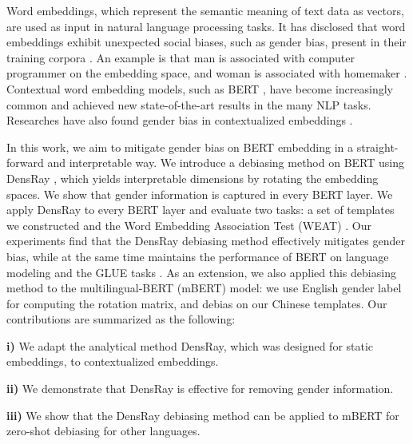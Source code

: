 Word embeddings, which represent the semantic meaning of text data as vectors, are used as input in natural language processing tasks. It has disclosed that word embeddings exhibit unexpected social biases, such as gender bias, present in their training corpora \citep{bolukbasi2016man, caliskan2017semantics,garg2018word}. An example is that man is associated with computer programmer on the embedding space, and woman is associated with homemaker \citep{bolukbasi2016man}. Contextual word embedding models, such as BERT \citep{devlin2018bert}, have become increasingly common and achieved new state-of-the-art results in the many NLP tasks. Researches have also found gender bias in contextualized embeddings \citep{zhao2019gender,may2019measuring}.

In this work, we aim to mitigate gender bias on BERT embedding in a straight-forward and interpretable way. We introduce a debiasing method on BERT using DensRay \citep{dufter2019analytical}, which yields interpretable dimensions by rotating the embedding spaces. We show that gender information is captured in every BERT layer. We apply DensRay to every BERT layer and evaluate two tasks: a set of templates we constructed and the Word Embedding Association Test (WEAT) \citep{caliskan2017semantics}. Our experiments find that the DensRay debiasing method effectively mitigates gender bias, while at the same time maintains the performance of BERT on language modeling and the GLUE tasks \citep{wang2018glue}. As an extension, we also applied this debiasing method to the multilingual-BERT (mBERT) model: we use English gender label for computing the rotation matrix, and debias on our Chinese templates. Our contributions are summarized as the following: 

\textbf{i)} We adapt the analytical method DensRay, which was designed for static embeddings, to contextualized embeddings. 

\textbf{ii)} We demonstrate that DensRay is effective for removing gender information.

\textbf{iii)}  We show that the DensRay debiasing method can be applied to mBERT for zero-shot debiasing for other languages.